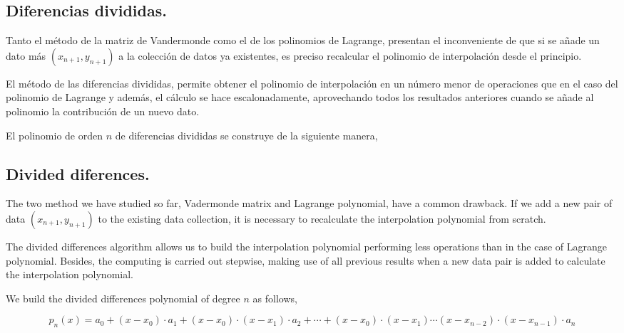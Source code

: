 \begin{paracol}{2}
\subsection{Diferencias divididas.}\label{sec:difdiv}  
Tanto el método de la matriz de Vandermonde como el de los polinomios de Lagrange, presentan el inconveniente de que si se añade un dato más $(x_{n+1}, y_{n+1})$ a la colección de datos ya existentes, es preciso recalcular el polinomio de interpolación desde el principio. 

El método de las diferencias divididas, permite obtener el polinomio de interpolación en un número menor de operaciones que en el caso del polinomio de Lagrange y además, el cálculo se hace escalonadamente, aprovechando todos los resultados anteriores cuando se añade al polinomio la contribución de un nuevo dato.

El polinomio de orden $n$ de diferencias divididas se construye de la siguiente manera,
\switchcolumn
\subsection{Divided diferences.} 
The two method we have studied so far, Vadermonde matrix and Lagrange polynomial, have a common drawback. If we add a new pair of data $(x_{n+1},y_{n+1})$ to the existing data collection, it is necessary to recalculate the interpolation polynomial from scratch.

The divided differences algorithm allows us to build the interpolation polynomial performing less operations than in the case of Lagrange polynomial. Besides, the computing is carried out stepwise, making use of all previous results when a new data  pair is added to calculate the interpolation polynomial.

We build the divided differences polynomial of degree $n$ as follows, 
\end{paracol}
\begin{equation*}
p_n(x)=a_0+(x-x_0)\cdot a_1+(x-x_0)\cdot (x-x_1)\cdot a_2+\cdots +(x-x_0)\cdot (x-x_1)\cdots (x-x_{n-2})\cdot(x-x_{n-1})\cdot a_n
\end{equation*}

